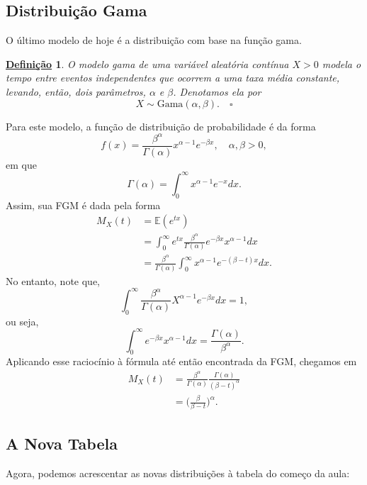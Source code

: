 \documentclass{article}
\newtheorem*{def*}{\underline{Defini\c c\~ao}}
\begin{document}
\subsection{Distribuição Gama}
O último modelo de hoje é a distribuição com base na função gama.
\begin{def*}
  O \textit{modelo gama} de uma variável aleatória contínua \(X > 0\) modela o tempo entre eventos independentes
  que ocorrem a uma taxa média constante, levando, então, dois parâmetros, \(\alpha\) e \(\beta \).
  Denotamos ela por 
  \[
    X\sim \mathrm{Gama}(\alpha , \beta ).\quad\square
  \]
\end{def*}
Para este modelo, a função de distribuição de probabilidade é da forma 
\[
  f(x) = \frac{\beta^{\alpha }}{\Gamma (\alpha )}x^{\alpha -1}e^{-\beta x},\quad \alpha , \beta > 0,
\]
em que 
\[
  \Gamma (\alpha ) = \int_{0}^{\infty}x^{\alpha -1}e^{-x }dx.
\]
Assim, sua FGM é dada pela forma
\begin{align*}
  M_{X}(t) &= \mathbb{E}(e^{tx})\\
           &= \int_{0}^{\infty}e^{tx}\frac{\beta ^{\alpha }}{\Gamma (\alpha )}e^{-\beta x}x^{\alpha -1}dx\\
           &= \frac{\beta ^{\alpha }}{\Gamma (\alpha )}\int_{0}^{\infty}x^{\alpha -1}e^{-(\beta -t)x}dx.
\end{align*}
No entanto, note que, 
\[
  \int_{0}^{\infty} \frac{\beta ^{\alpha }}{\Gamma (\alpha )}X^{\alpha -1}e^{-\beta x}dx = 1,
\]
ou seja, 
\[
  \int_{0}^{\infty}e^{-\beta x}x^{\alpha -1}dx = \frac{\Gamma (\alpha )}{\beta^{\alpha } }.
\]
Aplicando esse raciocínio à fórmula até então encontrada da FGM, chegamos em 
\begin{align*}
  M_{X}(t) &= \frac{\beta ^{\alpha }}{\Gamma (\alpha )}\frac{\Gamma (\alpha )}{(\beta - t)^{\alpha }} \\
           &= \biggl(\frac{\beta }{\beta -t}\biggr)^{\alpha }.
\end{align*}
\subsection{A Nova Tabela}
Agora, podemos acrescentar as novas distribuições à tabela do começo da aula:
\end{document}
